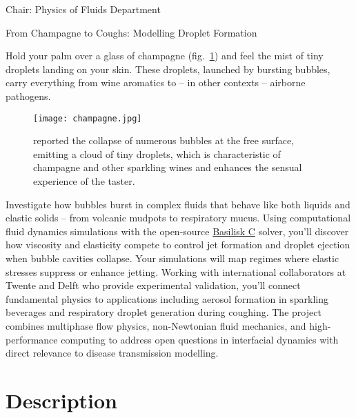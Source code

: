 \documentclass[a4paper,10pt]{article}
\begin{document}
\noindent Chair: Physics of Fluids Department

\begin{center}
	\begin{LARGE}
	From Champagne to Coughs: Modelling Droplet Formation
	\end{LARGE}
\end{center}

\noindent Hold your palm over a glass of champagne (fig.~\ref{fig:champange}) and feel the mist of tiny droplets landing on your skin. These droplets, launched by bursting bubbles, carry everything from wine aromatics to -- in other contexts -- airborne pathogens.

\begin{figure}[H]
\begin{center}
	\texttt{[image: champagne.jpg]}
	\caption{\citet{ghabache2016evaporation} reported the collapse of numerous bubbles at the free surface, emitting a cloud of tiny droplets, which is characteristic of champagne and other sparkling wines and enhances the sensual experience of the taster.}
	\label{fig:champange}
\end{center}
\end{figure}

\begin{tcolorbox}[colback=mgray,colframe=mpurple,title=TL;DR]
	Investigate how bubbles burst in complex fluids that behave like both liquids and elastic solids -- from volcanic mudpots to respiratory mucus. Using computational fluid dynamics simulations with the open-source \href{https://comphy-lab.org/MultiRheoFlow}{Basilisk C} solver, you'll discover how viscosity and elasticity compete to control jet formation and droplet ejection when bubble cavities collapse. Your simulations will map regimes where elastic stresses suppress or enhance jetting. Working with international collaborators at Twente and Delft who provide experimental validation, you'll connect fundamental physics to applications including aerosol formation in sparkling beverages and respiratory droplet generation during coughing. The project combines multiphase flow physics, non-Newtonian fluid mechanics, and high-performance computing to address open questions in interfacial dynamics with direct relevance to disease transmission modelling.
\end{tcolorbox}

\section*{Description}
\end{document}

